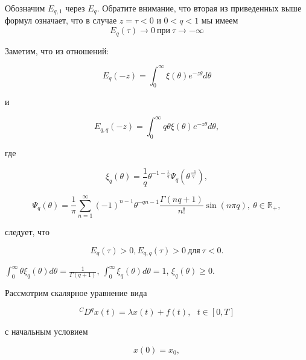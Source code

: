 Обозначим $E_{q,1}$ через $E_{q}$. Обратите внимание, что вторая из приведенных выше формул означает, что в случае
$z = \tau < 0$ и $0 < q < 1$ мы имеем
\begin{equation}
    E_{q}(\tau) \rightarrow 0 \ \text{при} \ \tau \rightarrow - \infty
\end{equation}

Заметим, что из отношений:

\begin{equation*}
    E_{q}(-z) = \int_{0}^{\infty} \xi(\theta)e^{-z\theta}d\theta
\end{equation*}

\noindent и

\begin{equation*}
    E_{q,q}(-z) = \int_{0}^{\infty} q\theta \xi(\theta)e^{-z\theta}d\theta,
\end{equation*}

\noindent где

\begin{equation}
    \xi_{q}(\theta) = \frac{1}{q} \theta^{-1-\frac{1}{q}}\Psi_{q}(\theta^{\frac{-1}{q}}),
\end{equation}

\begin{equation}
    \Psi_{q}(\theta) = \frac{1}{\pi} \sum_{n=1}^{\infty} (-1)^{n-1} \theta^{-qn-1} \frac{\Gamma(nq+1)}{n!} \sin(n \pi q), \ 
    \theta \in \mathbb{R}_{+},
\end{equation}

\noindent следует, что

\begin{equation}
    E_{q}(\tau) > 0, E_{q,q}(\tau) > 0 \ \text{для} \ \tau < 0.
\end{equation}

\begin{remark}
    $\int_{0}^{\infty} \theta \xi_{q}(\theta) d\theta = \frac{1}{\Gamma(q+1)}$,
    $\int_{0}^{\infty} \xi_{q}(\theta) d\theta = 1$, $\xi_{q}(\theta) \geq 0$.
\end{remark}

Рассмотрим скалярное уравнение вида

\begin{equation}
    \label{eq:dxt}
    {}^{C}D^{q} x(t) = \lambda x(t) + f(t), \ \ \ t \in [0, T]
\end{equation}

\noindent с начальным условием

\begin{equation}
    \label{eq:dxt_x0}
    x(0) = x_{0},
\end{equation}

